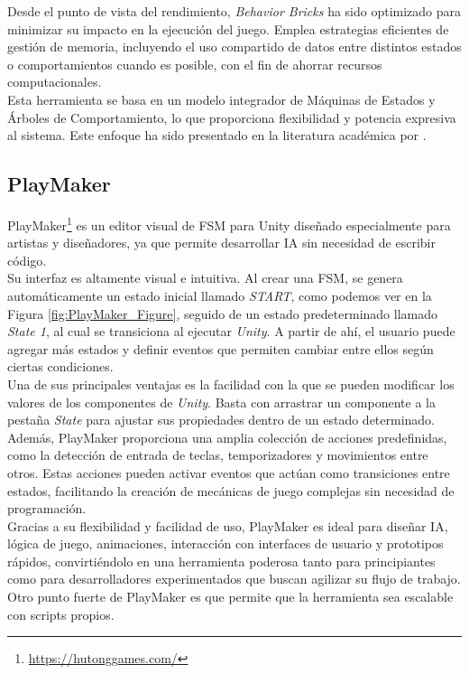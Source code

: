 Desde el punto de vista del rendimiento, \textit{Behavior Bricks} ha sido optimizado para minimizar su impacto en la ejecución del juego. Emplea estrategias eficientes de gestión de memoria, incluyendo el uso compartido de datos entre distintos estados o comportamientos cuando es posible, con el fin de ahorrar recursos computacionales.\\

Esta herramienta se basa en un modelo integrador de Máquinas de Estados y Árboles de Comportamiento, lo que proporciona flexibilidad y potencia expresiva al sistema. Este enfoque ha sido presentado en la literatura académica por \cite{BB}.
\subsection{PlayMaker}
PlayMaker\footnote{\url{https://hutonggames.com/}} es un editor visual de FSM para Unity diseñado especialmente para artistas y diseñadores, ya que permite desarrollar IA sin necesidad de escribir código.\\

Su interfaz es altamente visual e intuitiva. Al crear una FSM, se genera automáticamente un estado inicial llamado \textit{START}, como podemos ver en la Figura \ref{fig:PlayMaker_Figure}, seguido de un estado predeterminado llamado \textit{State 1}, al cual se transiciona al ejecutar \textit{Unity}. A partir de ahí, el usuario puede agregar más estados y definir eventos que permiten cambiar entre ellos según ciertas condiciones.\\

Una de sus principales ventajas es la facilidad con la que se pueden modificar los valores de los componentes de \textit{Unity}. Basta con arrastrar un componente a la pestaña \textit{State} para ajustar sus propiedades dentro de un estado determinado. Además, PlayMaker proporciona una amplia colección de acciones predefinidas, como la detección de entrada de teclas, temporizadores y movimientos entre otros. Estas acciones pueden activar eventos que actúan como transiciones entre estados, facilitando la creación de mecánicas de juego complejas sin necesidad de programación.\\

Gracias a su flexibilidad y facilidad de uso, PlayMaker es ideal para diseñar IA, lógica de juego, animaciones, interacción con interfaces de usuario y prototipos rápidos, convirtiéndolo en una herramienta poderosa tanto para principiantes como para desarrolladores experimentados que buscan agilizar su flujo de trabajo. Otro punto fuerte de PlayMaker es que permite que la herramienta sea escalable con scripts propios.\\

